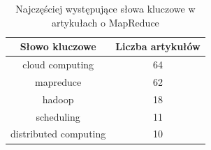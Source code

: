\begin{table}[t]
    \centering
    \caption{Najczęściej występujące słowa kluczowe w artykułach o MapReduce}
    \label{tabela_mapreduce}
    \begin{tabular}{|c|c|}
        \hline 
        Słowo kluczowe & Liczba artykułów\\
        \hline
        cloud computing & 64 \\
        \hline
        mapreduce & 62 \\
        \hline
        hadoop & 18 \\
        \hline
        scheduling & 11 \\
        \hline
        distributed computing & 10 \\
        \hline
    \end{tabular}
\end{table}


